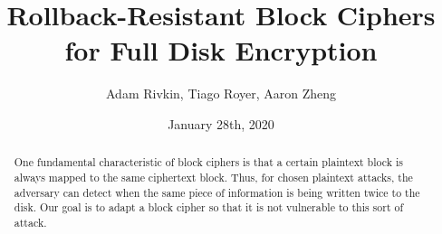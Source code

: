 \documentclass[11pt]{article}
\begin{document}
\title{
    Rollback-Resistant Block Ciphers for Full Disk Encryption
}
\date{January 28th, 2020}
\author{Adam Rivkin, Tiago Royer, Aaron Zheng}
\maketitle

\begin{abstract}
    One fundamental characteristic of block ciphers
    is that a certain plaintext block is always mapped to the same ciphertext block.
    Thus,
    for chosen plaintext attacks,
    the adversary can detect when the same piece of information
    is being written twice to the disk.
    Our goal is to adapt a block cipher
    so that it is not vulnerable to this sort of attack.
\end{abstract}
\end{document}

